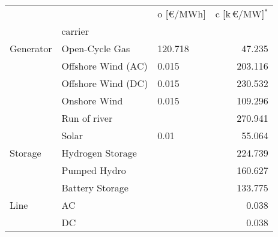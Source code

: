\begin{tabular}{lllr}
\toprule
     &    & o [\euro/MWh] &  c [k\,\euro/MW]$^*$ \\
{} & carrier &               &                      \\
\midrule
Generator & Open-Cycle Gas &       120.718 &               47.235 \\
     & Offshore Wind (AC) &         0.015 &              203.116 \\
     & Offshore Wind (DC) &         0.015 &              230.532 \\
     & Onshore Wind &         0.015 &              109.296 \\
     & Run of river &               &              270.941 \\
     & Solar &          0.01 &               55.064 \\
Storage & Hydrogen Storage &               &              224.739 \\
     & Pumped Hydro &               &              160.627 \\
     & Battery Storage &               &              133.775 \\
Line & AC &               &                0.038 \\
     & DC &               &                0.038 \\
\bottomrule
\end{tabular}
